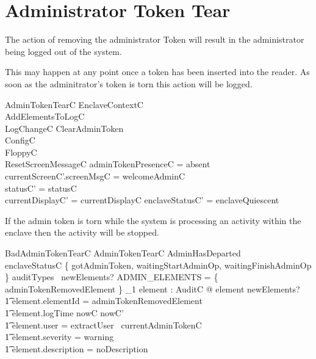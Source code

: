 \section{Administrator Token Tear}

The action of removing the administrator Token will result in the
administrator being logged out of the system.

This may happen at any point once a token has been inserted into the
reader. As soon as the adminitrator's token is torn this action will
be logged. 


\begin{schema}{AdminTokenTearC}
         EnclaveContextC
\\       AddElementsToLogC
\\       LogChangeC
\also
        ClearAdminToken
\\      \Xi ConfigC
\\      \Xi FloppyC
\\      ResetScreenMessageC
\where
        adminTokenPresenceC = absent
\also   
        currentScreenC'.screenMsgC = welcomeAdminC 
\\      statusC' = statusC
\\      currentDisplayC' = currentDisplayC
\also
        enclaveStatusC' = enclaveQuiescent
\end{schema}
If the admin token is torn while the system is processing an activity
within the enclave then the activity will be stopped.

\begin{schema}{BadAdminTokenTearC} 
        AdminTokenTearC
\where
        AdminHasDeparted
\\      enclaveStatusC \in \{ gotAdminToken, waitingStartAdminOp,
        waitingFinishAdminOp \} 
\also
        auditTypes~ newElements? \cap ADMIN\_ELEMENTS = 
        \{ adminTokenRemovedElement \} 
\also
        \exists_1 element : AuditC @ element \in newElements? 
\\ \t1  \land element.elementId = adminTokenRemovedElement
\\ \t1  \land element.logTime \in nowC \upto nowC'
\\ \t1  \land element.user = extractUser~ currentAdminTokenC
\\ \t1  \land element.severity = warning
\\ \t1  \land element.description = noDescription
\end{schema}


